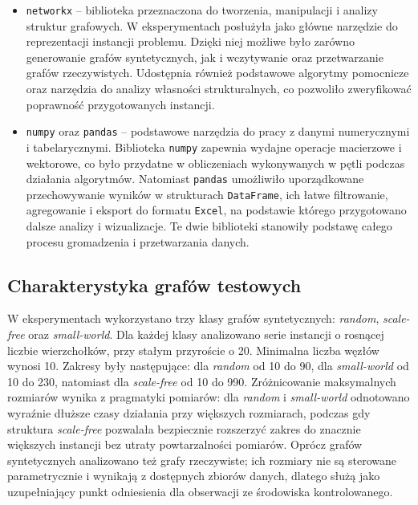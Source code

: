 \begin{itemize}
    \item \texttt{networkx} – biblioteka przeznaczona do tworzenia, manipulacji i analizy struktur grafowych. 
    W eksperymentach posłużyła jako główne narzędzie do reprezentacji instancji problemu. 
    Dzięki niej możliwe było zarówno generowanie grafów syntetycznych, 
    jak i wczytywanie oraz przetwarzanie grafów rzeczywistych. 
    Udostępnia również podstawowe algorytmy pomocnicze oraz narzędzia do analizy własności strukturalnych, 
    co pozwoliło zweryfikować poprawność przygotowanych instancji.

    \item \texttt{numpy} oraz \texttt{pandas} – podstawowe narzędzia do pracy z danymi numerycznymi i tabelarycznymi. 
    Biblioteka \texttt{numpy} zapewnia wydajne operacje macierzowe i wektorowe, co było przydatne w obliczeniach wykonywanych w pętli podczas działania algorytmów. 
    Natomiast \texttt{pandas} umożliwiło uporządkowane przechowywanie wyników w strukturach \texttt{DataFrame}, 
    ich łatwe filtrowanie, agregowanie i eksport do formatu \texttt{Excel}, 
    na podstawie którego przygotowano dalsze analizy i wizualizacje. 
    Te dwie biblioteki stanowiły podstawę całego procesu gromadzenia i przetwarzania danych.

\end{itemize}


\subsection{Charakterystyka grafów testowych}

W eksperymentach wykorzystano trzy klasy grafów syntetycznych: \textit{random}, \textit{scale-free} oraz \textit{small-world}. Dla każdej klasy analizowano serie instancji o rosnącej liczbie wierzchołków, przy stałym przyroście o 20. Minimalna liczba węzłów wynosi 10. Zakresy były następujące: dla \textit{random} od 10 do 90, dla \textit{small-world} od 10 do 230, natomiast dla \textit{scale-free} od 10 do 990. Zróżnicowanie maksymalnych rozmiarów wynika z pragmatyki pomiarów: dla \textit{random} i \textit{small-world} odnotowano wyraźnie dłuższe czasy działania przy większych rozmiarach, podczas gdy struktura \textit{scale-free} pozwalała bezpiecznie rozszerzyć zakres do znacznie większych instancji bez utraty powtarzalności pomiarów. Oprócz grafów syntetycznych analizowano też grafy rzeczywiste; ich rozmiary nie są sterowane parametrycznie i wynikają z dostępnych zbiorów danych, dlatego służą jako uzupełniający punkt odniesienia dla obserwacji ze środowiska kontrolowanego.


